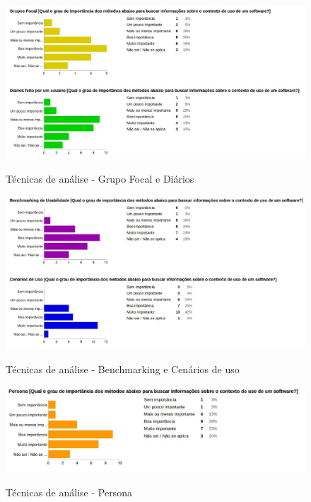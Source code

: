 	\begin{figure}[!h]
    	\centering
    	\includegraphics[keepaspectratio=true,scale=0.50]
      		{figuras/analise4.eps}
    	\label{check04}
		\caption{Técnicas de análise - Grupo Focal e Diários}
	\end{figure}
	
	
	\begin{figure}[!h]
    	\centering
    	\includegraphics[keepaspectratio=true,scale=0.50]
      		{figuras/analise5.eps}
    	\label{check04}
		\caption{Técnicas de análise - Benchmarking e Cenários de uso}
	\end{figure}
		
	\begin{figure}[!h]
    	\centering
    	\includegraphics[keepaspectratio=true,scale=0.55]
      		{figuras/analise6.eps}
    	\label{check04}
		\caption{Técnicas de análise - Persona}
	\end{figure}

